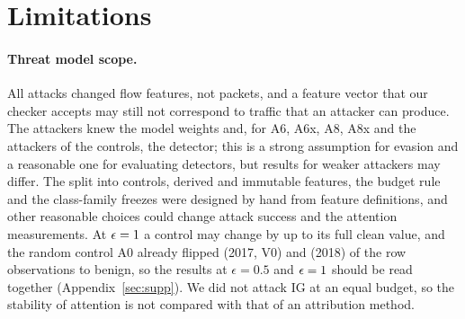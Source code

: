 \section{Limitations}
\label{sec:limitations}

\paragraph{Threat model scope.}
All attacks changed flow features, not packets, and a feature vector that our checker accepts may still not correspond
to traffic that an attacker can produce.
The attackers knew the model weights and, for A6, A6x, A8, A8x and the attackers of the controls, the detector; this is
a strong assumption for evasion and a reasonable one for evaluating detectors, but results for weaker attackers may
differ.
The split into \nControls{} controls, \nDerived{} derived and \nImmutable{} immutable features, the budget rule and the
class-family freezes were designed by hand from feature definitions, and other reasonable choices could change attack
success and the attention measurements.
At $\epsilon = 1$ a control may change by up to its full clean value, and the random control A0 already
flipped \azeroBenignShareVzeroSeventeen{} (2017, V0) and \azeroBenignShareVzeroEighteen{} (2018) of the row observations
to benign, so the results at $\epsilon = 0.5$ and $\epsilon = 1$ should be read together
(Appendix~\ref{sec:supp}).
We did not attack IG at an equal budget, so the stability of attention is not compared with that of an attribution
method.

